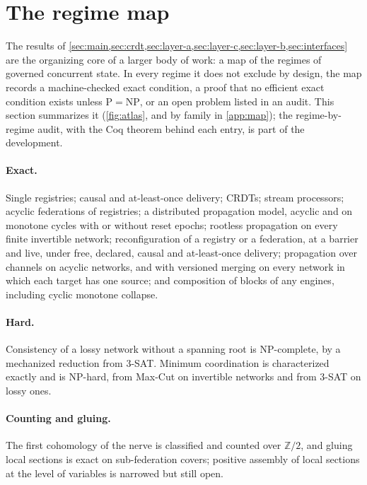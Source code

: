 
\section{The regime map}\label{sec:map}

The results of \cref{sec:main,sec:crdt,sec:layer-a,sec:layer-c,sec:layer-b,sec:interfaces} are the
organizing core of a larger body of work: a map of the regimes of governed concurrent state. In every
regime it does not exclude by design, the map records a machine-checked exact condition, a proof that no efficient exact condition
exists unless $\mathrm{P} = \mathrm{NP}$, or an open problem listed in an audit. This section summarizes it (\cref{fig:atlas}, and by family in
\cref{app:map}); the regime-by-regime audit,
with the Coq theorem behind each entry, is part of the development.

\paragraph{Exact.} Single registries; causal and at-least-once delivery; CRDTs; stream processors;
acyclic federations of registries; a distributed propagation model, acyclic and on monotone cycles
with or without reset epochs; rootless propagation on every finite invertible network;
reconfiguration of a registry or a federation, at a barrier and live, under free, declared, causal
and at-least-once delivery; propagation over channels on acyclic networks, and with versioned merging
on every network in which each target has one source; and composition of blocks of any engines,
including cyclic monotone collapse.

\paragraph{Hard.} Consistency of a lossy network without a spanning root is NP-complete, by a
mechanized reduction from 3-SAT. Minimum coordination is characterized exactly and is NP-hard, from
Max-Cut on invertible networks and from 3-SAT on lossy ones.

\paragraph{Counting and gluing.} The first cohomology of the nerve is classified and counted over
$\mathbb{Z}/2$, and gluing local sections is exact on sub-federation covers; positive assembly of
local sections at the level of variables is narrowed but still open.

